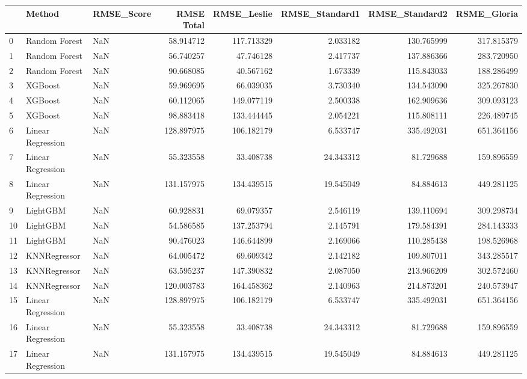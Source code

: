 \begin{tabular}{lllrrrrr}
\toprule
{} &             Method & RMSE\_Score &  RMSE Total &  RMSE\_Leslie &  RMSE\_Standard1 &  RMSE\_Standard2 &  RSME\_Gloria \\
\midrule
0  &      Random Forest &        NaN &   58.914712 &   117.713329 &        2.033182 &      130.765999 &   317.815379 \\
1  &      Random Forest &        NaN &   56.740257 &    47.746128 &        2.417737 &      137.886366 &   283.720950 \\
2  &      Random Forest &        NaN &   90.668085 &    40.567162 &        1.673339 &      115.843033 &   188.286499 \\
3  &            XGBoost &        NaN &   59.969695 &    66.039035 &        3.730340 &      134.543090 &   325.267830 \\
4  &            XGBoost &        NaN &   60.112065 &   149.077119 &        2.500338 &      162.909636 &   309.093123 \\
5  &            XGBoost &        NaN &   98.883418 &   133.444445 &        2.054221 &      115.808111 &   226.489745 \\
6  &  Linear Regression &        NaN &  128.897975 &   106.182179 &        6.533747 &      335.492031 &   651.364156 \\
7  &  Linear Regression &        NaN &   55.323558 &    33.408738 &       24.343312 &       81.729688 &   159.896559 \\
8  &  Linear Regression &        NaN &  131.157975 &   134.439515 &       19.545049 &       84.884613 &   449.281125 \\
9  &           LightGBM &        NaN &   60.928831 &    69.079357 &        2.546119 &      139.110694 &   309.298734 \\
10 &           LightGBM &        NaN &   54.586585 &   137.253794 &        2.145791 &      179.584391 &   284.143333 \\
11 &           LightGBM &        NaN &   90.476023 &   146.644899 &        2.169066 &      110.285438 &   198.526968 \\
12 &       KNNRegressor &        NaN &   64.005472 &    69.609342 &        2.142182 &      109.807011 &   343.285517 \\
13 &       KNNRegressor &        NaN &   63.595237 &   147.390832 &        2.087050 &      213.966209 &   302.572460 \\
14 &       KNNRegressor &        NaN &  120.003783 &   164.458362 &        2.140963 &      214.873201 &   240.573947 \\
15 &  Linear Regression &        NaN &  128.897975 &   106.182179 &        6.533747 &      335.492031 &   651.364156 \\
16 &  Linear Regression &        NaN &   55.323558 &    33.408738 &       24.343312 &       81.729688 &   159.896559 \\
17 &  Linear Regression &        NaN &  131.157975 &   134.439515 &       19.545049 &       84.884613 &   449.281125 \\
\bottomrule
\end{tabular}
